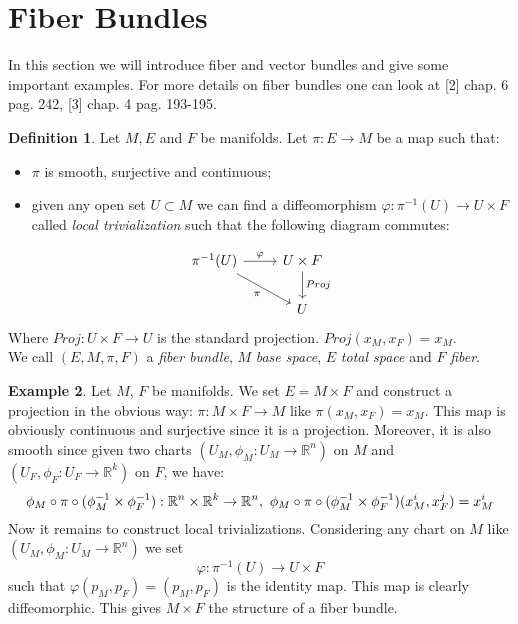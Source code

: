\documentclass[12pt,a4paper]{report}
\theoremstyle{definition}
\newtheorem{Def}{Definition}[chapter]
\theoremstyle{Theorem}
\theoremstyle{definition}
\newtheorem{Ex}[Def]{Example}
\theoremstyle{definition}
\begin{document}
	\section{Fiber Bundles}
	In this section we will introduce fiber and vector bundles and give some important examples. For more details on fiber bundles one can look at [2] chap. 6 pag. 242, [3] chap. 4 pag. 193-195.
	\begin{Def}
		Let $M, E$ and $F$ be manifolds. Let $\pi: E\rightarrow M$ be a map such that:
		\begin{itemize}
			\item $\pi$ is smooth, surjective and continuous;
			\item given any open set $U\subset M$ we can find a diffeomorphism $\varphi: \pi^{-1}(U)\rightarrow U\times F$ called \textit{local trivialization} such that the following diagram commutes:
		\end{itemize}
		\[
		\begin{tikzcd}
			\pi^{-1}(U) \arrow{r}{\varphi} \arrow[swap]{dr}{\pi} & U\times F \arrow{d}{Proj}\\
			& U 
		\end{tikzcd}
		\]
		Where $Proj: U\times F\rightarrow U$ is the standard projection. $Proj(x_M,x_F)=x_M$.\\
		We call $(E,M,\pi,F)$ a \textit{fiber bundle}, $M$ \textit{base space}, $E$ \textit{total space} and $F$ \textit{fiber}.
	\end{Def}
	\begin{Ex}\label{Ex_1.1}
		Let $M$, $F$ be manifolds. We set $E=M\times F$ and construct a projection in the obvious way: 
		$\pi:M\times F\rightarrow M$ like $\pi(x_M,x_F)=x_M$. This map is obviously continuous and surjective since it is a projection. Moreover, it is also smooth since given two charts $(U_M,\phi_M:U_M\rightarrow \mathbb{R}^n)$ on $M$ and $(U_F,\phi_F:U_F\rightarrow \mathbb{R}^k)$ on $F$, we have:
		$$\phi_M\circ \pi\circ (\phi_M^{-1}\times \phi_F^{-1}):\mathbb{R}^n\times\mathbb{R}^k\rightarrow\mathbb{R}^n,\hbox{ }\phi_M\circ \pi\circ (\phi_M^{-1}\times \phi_F^{-1})(x^i_M,x^j_F)=x^i_M$$
		Now it remains to construct local trivializations. Considering any chart on $M$ like $(U_M,\phi_M:U_M\rightarrow \mathbb{R}^n)$ we set
		$$\varphi:\pi^{-1}(U)\rightarrow U\times F$$
		such that $\varphi(p_M,p_F)=(p_M,p_F)$ is the identity map. This map is clearly diffeomorphic.
		This gives $M\times F$ the structure of a fiber bundle.
	\end{Ex}
\end{document}
